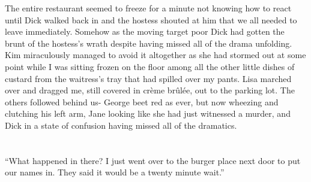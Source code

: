 \documentclass[]{book}
\begin{document}
The entire restaurant seemed to freeze for a minute not knowing how to
react until Dick walked back in and the hostess shouted at him that we
all needed to leave immediately. Somehow as the moving target poor Dick
had gotten the brunt of the hostess's wrath despite having missed all of
the drama unfolding. Kim miraculously managed to avoid it altogether as
she had stormed out at some point while I was sitting frozen on the
floor among all the other little dishes of custard from the waitress's
tray that had spilled over my pants. Lisa marched over and dragged me,
still covered in crème brûlée, out to the parking lot. The others
followed behind us- George beet red as ever, but now wheezing and
clutching his left arm, Jane looking like she had just witnessed a
murder, and Dick in a state of confusion having missed all of the
dramatics.

\chapter{}\label{section-8}

``What happened in there? I just went over to the burger place next door
to put our names in. They said it would be a twenty minute wait.''

\chapter{}\label{section-9}
\end{document}
